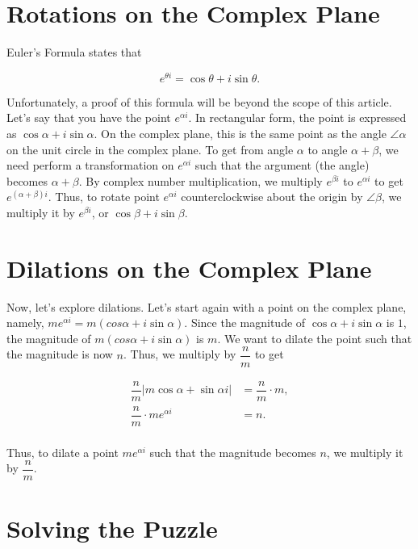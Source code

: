\documentclass{article}
\begin{document}
\section{Rotations on the Complex Plane}

Euler's Formula states that 

$$e^{\theta i} = \cos{\theta} + i\sin{\theta}.$$

Unfortunately, a proof of this formula will be beyond the scope of this article.\\

Let's say that you have the point $e^{\alpha i}$. In rectangular form, the point is expressed as $\cos{\alpha} + i\sin{\alpha}$. On the complex plane, this is the same point as the angle $\angle{\alpha}$ on the unit circle in the complex plane. To get from angle $\alpha$ to angle $\alpha + \beta$, we need perform a transformation on $e^{\alpha i}$ such that the argument (the angle) becomes $\alpha + \beta$. By complex number multiplication, we multiply $e^{\beta i}$ to $e^{\alpha i}$ to get $e^{(\alpha + \beta) i}$. Thus, to rotate point $e^{\alpha i}$ counterclockwise about the origin by $\angle{\beta}$, we multiply it by $e^{\beta i}$, or $\cos{\beta} + i\sin{\beta}$. \\

\section{Dilations on the Complex Plane}

Now, let's explore dilations. Let's start again with a point on the complex plane, namely, $me^{\alpha i} = m(cos{\alpha} + i\sin{\alpha})$. Since the magnitude of $\cos\alpha + i\sin{\alpha}$ is $1$, the magnitude of $m(cos{\alpha} + i\sin{\alpha})$ is $m$. We want to dilate the point such that the magnitude is now $n$. Thus, we multiply by $\dfrac{n}{m}$ to get

\begin{align*}
\dfrac{n}{m} |m\cos\alpha + \sin{\alpha}i| &= \dfrac{n}{m} \cdot m,\\
\dfrac{n}{m} \cdot me^{\alpha i} &= n.\\
\end{align*}

Thus, to dilate a point $me^{\alpha i}$ such that the magnitude becomes $n$, we multiply it by $\dfrac{n}{m}$.

\section{Solving the Puzzle}
\end{document}
